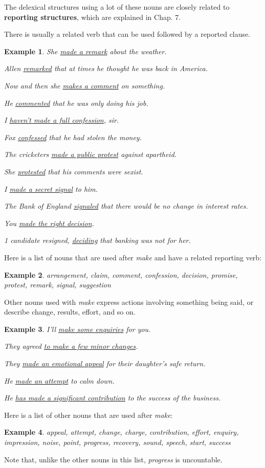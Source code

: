 \documentclass[oneside]{book}
\numberwithin{equation}{section}
\newtheorem{example}{Example}[section]
\begin{document}
%
The delexical structures using a lot of these nouns are closely related to \textbf{reporting structures}, which are explained in Chap. 7.

There is usually a related verb that can be used followed by a reported clause.
\begin{example}
    She \underline{made a remark} about the weather.
    
    Allen \underline{remarked} that at times he thought he was back in America.
    
    Now and then she \underline{makes a comment} on something.
    
    He \underline{commented} that he was only doing his job.
    
    I \underline{haven't made a full confession}, sir.
    
    Fox \underline{confessed} that he had stolen the money.
    
    The cricketers \underline{made a public protest} against apartheid.
    
    She \underline{protested} that his comments were sexist.
    
    I \underline{made a secret signal} to him.
    
    The Bank of England \underline{signaled} that there would be no change in interest rates.
    
    You \underline{made the right decision}.
    
    1 candidate resigned, \underline{deciding} that banking was not for her.
\end{example}
Here is a list of nouns that are used after \textit{make} and have a related reporting verb:
\begin{example}
    arrangement, claim, comment, confession, decision, promise, protest, remark, signal, suggestion
\end{example}
Other nouns used with \textit{make} express actions involving something being said, or describe change, results, effort, and so on.
\begin{example}
    I'll \underline{make some enquiries} for you.
    
    They agreed \underline{to make a few minor changes}.
    
    They \underline{made an emotional appeal} for their daughter's safe return.
    
    He \underline{made an attempt} to calm down.
    
    He \underline{has made a significant contribution} to the success of the business.
\end{example}
Here is a list of other nouns that are used after \textit{make}:
\begin{example}
    appeal, attempt, change, charge, contribution, effort, enquiry, impression, noise, point, progress, recovery, sound, speech, start, success
\end{example}
Note that, unlike the other nouns in this list, \textit{progress} is uncountable.
\end{document}
